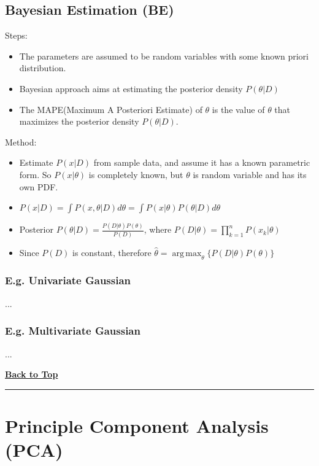 \documentclass[letterpaper,10pt]{article}
\DeclareMathOperator*{\argmax}{arg\,max}
\newcommand{\pandochline}{\vspace{2em}\href{./document.html}{\textbf{Back to Top}}
	\vspace{-2em}\begin{center}\rule{\textwidth}{1pt}\end{center}}
\begin{document}
\subsection{Bayesian Estimation (BE)}
Steps:
\begin{itemize}
	\item The parameters are assumed to be random variables with some known priori distribution.
	\item Bayesian approach aims at estimating the posterior density $P(\theta|D)$
	\item The MAPE(Maximum A Posteriori Estimate) of $\theta$ is the value of $\theta$ that maximizes the posterior density $P(\theta|D)$.
\end{itemize}
Method:
\begin{itemize}
	\item Estimate $P(x|D)$ from sample data, and assume it has a known parametric form. So $P(x|\theta)$ is completely known, but $\theta$ is random variable and has its own PDF.
	\item $P(x|D)=\int{P(x,\theta|D)d\theta}=\int{P(x|\theta)P(\theta|D)d\theta}$
	\item Posterior $P(\theta|D)=\frac{P(D|\theta)P(\theta)}{P(D)}$, where $P(D|\theta)=\prod_{k=1}^{n}{P(x_k|\theta)}$
	\item Since $P(D)$ is constant, therefore $\hat{\theta}=\argmax_\theta\{P(D|\theta)P(\theta)\}$
\end{itemize}

\subsubsection{E.g. Univariate Gaussian}
...

\subsubsection{E.g. Multivariate Gaussian}
...

\pandochline
\section{Principle Component Analysis (PCA)}
\end{document}
